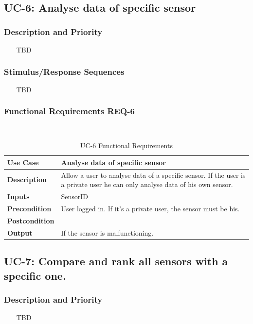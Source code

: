 \documentclass{report}
\begin{document}
\subsection{UC-6: Analyse data of specific sensor}

\subsubsection*{Description and Priority} ~~~
TBD

\subsubsection*{Stimulus/Response Sequences} ~~~
TBD

\subsubsection*{Functional Requirements REQ-6} ~~~
\begin{table}[H]
	\begin{center}
		\begin{tabular}{|m{4cm}|m{10cm}|}
		\hline
		\textbf{Use Case} & Analyse data of specific sensor \\
		\hline
		\textbf{Description} & Allow a user to analyse data of a specific sensor. If the user is a private user he can only analyse data of his own sensor.  \\
		\hline
		\textbf{Inputs} &  SensorID\\
		\hline
		\textbf{Precondition} & User logged in. If it's a private user, the sensor must be his. \\
		\hline
		\textbf{Postcondition} &  \\
		\hline
		\textbf{Output} & If the sensor is malfunctioning. \\
		\hline
		\end{tabular}
	\end{center}
	\caption{UC-6 Functional Requirements}
	\label{table:REQ-6}
\end{table}

\subsection{UC-7: Compare and rank all sensors with a specific one.}

\subsubsection*{Description and Priority} ~~~
TBD
\end{document}
